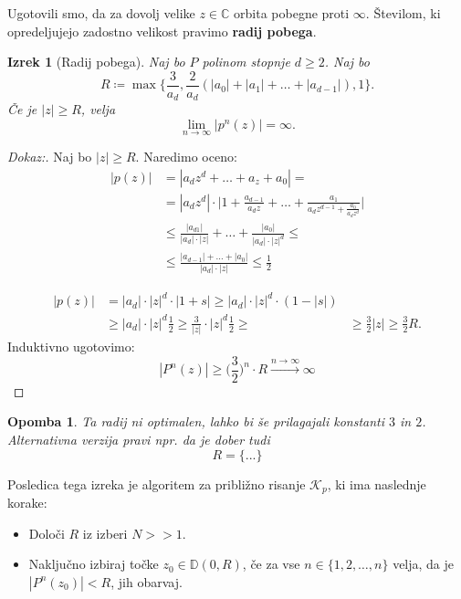 \documentclass{article}
\newtheorem{opomba}{Opomba}
\newtheorem{izrek}{Izrek}
\newcommand{\C}{\mathbb{C}}
\newcommand{\D}{\mathbb{D}}
\begin{document}
Ugotovili smo, da za dovolj velike $z\in \C$ orbita pobegne proti $\infty$.
Številom, ki opredeljujejo zadostno velikost pravimo \textbf{radij pobega}.

\begin{izrek}[Radij pobega]
Naj bo $P$ polinom stopnje $d\geq 2$. Naj bo 
\begin{equation}
R \coloneqq \max\Big\{\frac{3}{a_d}, \frac{2}{a_d}(|a_0| + |a_1| + \dots + |a_{d-1}|)
, 1 \Big\}.
\end{equation}
Če je $|z| \geq R$, velja 
\begin{equation}
\lim_{n\rightarrow \infty} |p^n(z)| = \infty.
\end{equation}
\end{izrek}

\begin{proof}[Dokaz:]
Naj bo $|z| \geq R$. Naredimo oceno: 
\begin{align*}
|p(z)| &= |a_d z^d + \dots + a_z + a_0| = \\
&= |a_d z^d| \cdot \Big|1 + \frac{a_{d-1}}{a_d z} + \dots + \frac{a_1}{a_d z^{d-1} + \frac{a_0}{a_d z^d}}\Big| \\
&\leq \frac{|a_{d1}|}{|a_d|\cdot |z|} + \dots + \frac{|a_0|}{|a_d|\cdot |z|^d} \leq \\
&\leq \frac{|a_{d-1}| + \dots + |a_0|}{|a_d| \cdot |z|} \leq \frac{1}{2}
\end{align*}

\begin{align*}
|p(z)| &= |a_d| \cdot |z|^d \cdot |1 + s| \geq |a_d|\cdot |z|^d \cdot (1 - |s|)\\
&\geq |a_d| \cdot |z|^d \frac{1}{2} \geq \frac{3}{|z|} \cdot |z|^d \frac{1}{2} \geq
&\geq \frac{3}{2} |z| \geq \frac{3}{2} R.
\end{align*}
Induktivno ugotovimo:
$$
|P^n(z)| \geq \Big(\frac{3}{2} \Big)^n \cdot R \xrightarrow{n\rightarrow \infty} \infty
$$
\end{proof}

\begin{opomba}
Ta radij ni optimalen, lahko bi še prilagajali konstanti $3$ in $2$. 
Alternativna verzija pravi npr. da je dober tudi 
$$
R = \Big\{... \Big\}
$$
\end{opomba}

Posledica tega izreka je algoritem za približno risanje $\mathcal{K}_p$, ki 
ima naslednje korake:
\begin{itemize}
    \item Določi $R$ iz izberi $N>> 1$.
    \item Naključno izbiraj točke $z_0 \in \D(0, R)$, če za vse $n\in \{1, 2, \dots, n\}$
    velja, da je $|P^n(z_0)| < R$, jih obarvaj.
\end{itemize}
\end{document}
